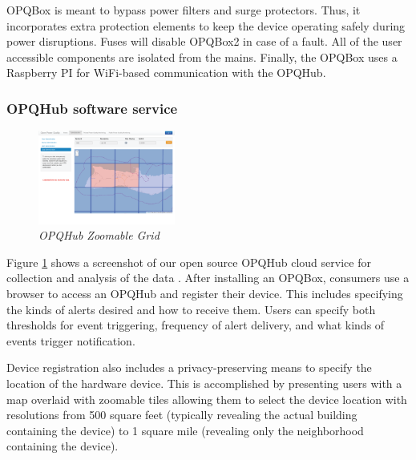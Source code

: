 OPQBox is meant to bypass power filters and surge protectors. Thus, it incorporates extra protection elements to keep the device operating safely during power disruptions. Fuses will disable OPQBox2 in case of a fault. All of the user accessible components are isolated from the mains. Finally, the OPQBox uses a Raspberry PI for WiFi-based communication with the OPQHub. 

\subsubsection{OPQHub software service}

\begin{figure}
  \includegraphics[width=0.4\textwidth]{figures/cloud-grid.eps}
  \caption{\em \small OPQHub Zoomable Grid}
  \label{fig:cloud-grid}
\end{figure}  

Figure \ref{fig:cloud-grid} shows a screenshot of our open source OPQHub cloud service for collection and analysis of the data \cite{opq-github}.  After installing an OPQBox, consumers use a browser to access an OPQHub and register their device. This includes specifying the kinds of alerts desired and how to receive them.  Users can specify both thresholds for event triggering, frequency of alert delivery, and what kinds of events trigger notification. 

Device registration also includes a privacy-preserving means to specify the location of the hardware device. This is accomplished by presenting users with a map overlaid with zoomable tiles allowing them to select the device location with resolutions from 500 square feet (typically revealing the actual building containing the device) to 1 square mile (revealing only the neighborhood containing the device).


